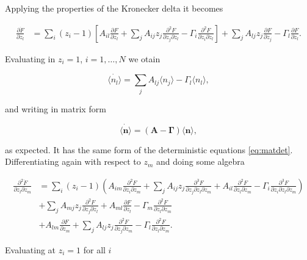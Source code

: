 Applying the properties of the Kronecker delta it becomes

\begin{equation*}
\begin{split}
\frac{\partial \dot{F}}{\partial z_l} &= \sum_i(z_i-1)\left[A_{il}\frac{\partial F}{\partial z_l}+\sum_jA_{ij}z_j\frac{\partial^2 F}{\partial z_j\partial z_l}-\Gamma_i\frac{\partial^2 F}{\partial z_i\partial z_l}\right]+\sum_jA_{lj}z_j\frac{\partial F}{\partial z_j}-\Gamma_l\frac{\partial F}{\partial z_l}.
\end{split}
\end{equation*}

Evaluating in $z_i=1$, $i=1,\dotsc,N$ we otain

\begin{equation*}
\dot{\langle n_l \rangle} = \sum_jA_{lj}\langle n_j\rangle-\Gamma_l\langle n_l\rangle,
\end{equation*}

and writing in matrix form

\begin{equation}
  \label{eq:mas-general_ave}
  \dot{\langle \mathbf{n}\rangle} = (\mathbf{A}-\mathbf{\Gamma})\langle \mathbf{n}\rangle,
\end{equation}

as expected. It has the same form of the deterministic equations \eqref{eq:matdet}. Differentiating again with respect to $z_m$ and doing some algebra

\begin{equation*}
  \begin{split}
    \frac{\partial^2 \dot{F}}{\partial z_l \partial z_m} &= \sum_i(z_i-1) \left(A_{im}\frac{\partial^2F}{\partial z_i \partial z_m} + \sum_jA_{ij}z_j\frac{\partial^3F}{\partial z_j \partial z_l \partial z_m}+A_{il}\frac{\partial^2F}{\partial z_l\partial z_m} - \Gamma_i\frac{\partial^3F}{\partial z_i \partial z_l \partial z_m}   \right)\\
    &+\sum_jA_{mj}z_j\frac{\partial^2F}{\partial z_j\partial z_l}+A_{ml}\frac{\partial F}{\partial z_l} - \Gamma_m\frac{\partial^2F}{\partial z_l\partial z_m}\\
    &+ A_{lm}\frac{\partial F}{\partial z_m} + \sum_jA_{lj}z_j\frac{\partial^2F}{\partial z_j\partial z_m}-\Gamma_l\frac{\partial^2F}{\partial z_l\partial z_m}.
  \end{split}
\end{equation*}

Evaluating at $z_i=1$ for all $i$

